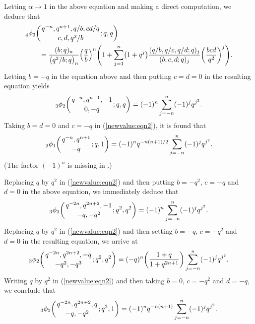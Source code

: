 \documentclass[10pt,a4paper]{amsart}
\numberwithin{equation}{section}
\begin{document}
Letting $\alpha \to 1$ in the above equation and making a direct computation, we deduce that
\begin{align}\label{newvalue:eqn2}
	&{_4\phi_3}\biggl({{q^{-n}, q^{n+1}, q/b, cd/q }\atop{c, d, q^2/b}}; q, q\biggr)\\
	&\qquad{}=\frac{(b; q)_n} {\bigl(q^2/b; q\bigr)_n } \Bigl(\frac{q} {b}\Bigr)^n
	\Biggl(1+\sum_{j=1}^n \bigl(1+q^{j}\bigr)\frac{(q/b, q/c, q/d; q)_j}
	{(b, c, d; q)_j}\biggl(\frac{ bcd}{q^2}\biggr)^{j}\Biggr).\nonumber
\end{align}
Letting $b=-q$ in the equation above and then putting $c=d=0$ in the resulting equation yields%
\begin{equation}\label{newvalue:eqn3}
{_3\phi_2}\biggl({{q^{-n}, q^{n+1}, -1}\atop{0, -q}}; q, q\biggr)
=(-1)^n \sum_{j=-n}^n (-1)^j q^{j^2}.
\end{equation}
Taking $b=d=0$ and $c=-q$ in (\ref{newvalue:eqn2}), it is found that \cite[p.~2088]{Liu2013IJTN}
\begin{equation}\label{newvalue:eqn4}
{_2\phi_1}\biggl({{q^{-n}, q^{n+1}}\atop{ -q}}; q, 1\biggr)
=(-1)^n q^{-n(n+1)/2} \sum_{j=-n}^n (-1)^j q^{j^2}.
\end{equation}
(The factor $(-1)^n$ is missing in \cite[Propositions 2.4--2.6 and Theorem~4.10]{Liu2013IJTN}.)

Replacing $q$ by $q^2$ in (\ref{newvalue:eqn2}) and then putting $b=-q^2$, $c=-q$ and $d=0$ in the above equation, we immediately deduce that
\begin{equation}\label{newvalue:eqn5}
{_3\phi_2}\biggl({{q^{-2n}, q^{2n+2}, -1}\atop{-q, -q^2}}; q^2, q^2\biggr)=(-1)^n \sum_{j=-n}^n (-1)^j q^{j^2}.
\end{equation}	
 Replacing $q$ by $q^2$ in (\ref{newvalue:eqn2}) and then setting $b=-q$, $c=-q^2$ and $d=0$ in the resulting equation, we arrive at
 \begin{equation*}%
 	{_3\phi_2}\biggl({{q^{-2n}, q^{2n+2}, -q}\atop{-q^2, -q^3}}; q^2, q^2\biggr)=(-q)^n \biggl(\frac{1+q}{1+q^{2n+1}}\biggr)\sum_{j=-n}^n (-1)^j q^{j^2}.
 \end{equation*}	
Writing $q$ by $q^2$ in (\ref{newvalue:eqn2}) and then
 taking $b=0$, $c=-q^2$ and $d=-q$, we conclude that \mbox{\cite[equa\-tion~(2.7)]{WangYee2019}}
 \begin{equation*}%
 	{_3\phi_2}\biggl({{q^{-2n}, q^{2n+2}, q}\atop{-q, -q^2}}; q^2, 1\biggr)=(-1)^n q^{-n(n+1)}\sum_{j=-n}^n (-1)^j q^{j^2}.
 	\end{equation*}
\end{document}
